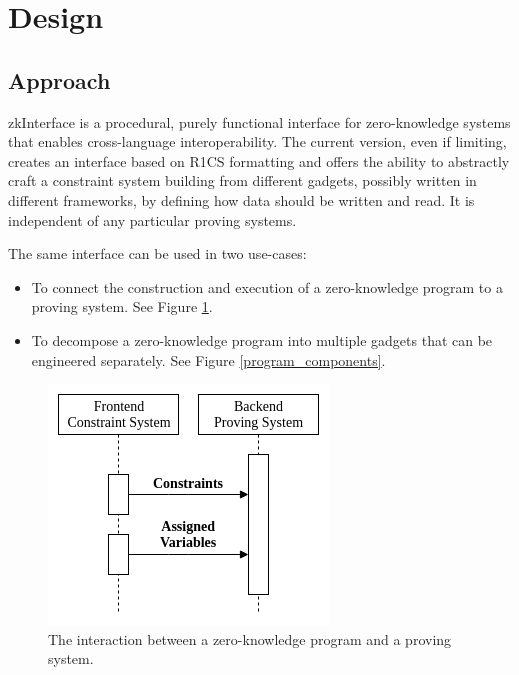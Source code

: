 \section{Design}

\subsection{Approach}

	zkInterface is a procedural, purely functional interface for zero-knowledge systems that enables cross-language interoperability. The current version, even if limiting, creates an interface based on R1CS formatting and offers the ability to abstractly craft a constraint system building from different gadgets, possibly written in different frameworks, by defining how data should be written and read.
	It is independent of any particular proving systems.

	The same interface can be used in two use-cases:
	\begin{itemize}
		\item To connect the construction and execution of a zero-knowledge program
			to a proving system. See Figure \ref{program_proving}.

		\item To decompose a zero-knowledge program into multiple gadgets that can be engineered separately. See Figure \ref{program_components}.
	\end{itemize}
	
\begin{figure}[!h]
	\centering
	\includegraphics[width=0.5\linewidth]{graphics/program_proving.png}
	\caption{The interaction between a zero-knowledge program and a proving system.}
	\label{program_proving}
\end{figure}

